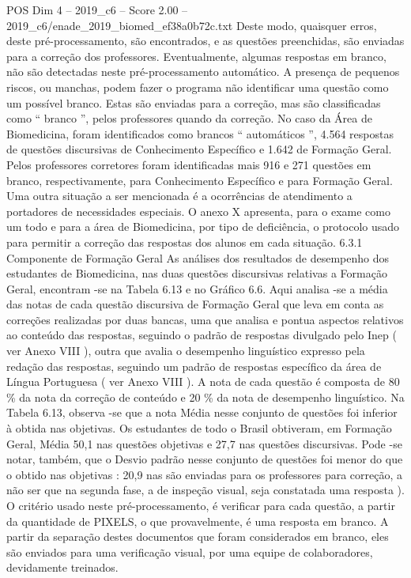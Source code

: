 \begin{textsample}{POS Dim 4 – 2019\_c6 – Score 2.00 – 2019\_c6/enade\_2019\_biomed\_ef38a0b72c.txt}
Deste modo, quaisquer erros, deste pré-processamento, são encontrados, e as questões preenchidas, são enviadas para a correção dos professores.
Eventualmente, algumas respostas em branco, não são detectadas neste pré-processamento automático.
A presença de pequenos riscos, ou manchas, podem fazer o programa não identificar uma questão como um possível branco.
Estas são enviadas para a correção, mas são classificadas como “ branco ”, pelos professores quando da correção.
No caso da Área de Biomedicina, foram identificados como brancos “ automáticos ”, 4.564 respostas de questões discursivas de Conhecimento Específico e 1.642 de Formação Geral.
Pelos professores corretores foram identificadas mais 916 e 271 questões em branco, respectivamente, para Conhecimento Específico e para Formação Geral.
Uma outra situação a ser mencionada é a ocorrências de atendimento a portadores de necessidades especiais.
O anexo X apresenta, para o exame como um todo e para a área de Biomedicina, por tipo de deficiência, o protocolo usado para permitir a correção das respostas dos alunos em cada situação. 6.3.1 Componente de Formação Geral As análises dos resultados de desempenho dos estudantes de Biomedicina, nas duas questões discursivas relativas a Formação Geral, encontram -se na Tabela 6.13 e no Gráfico 6.6.
Aqui analisa -se a média das notas de cada questão discursiva de Formação Geral que leva em conta as correções realizadas por duas bancas, uma que analisa e pontua aspectos relativos ao conteúdo das respostas, seguindo o padrão de respostas divulgado pelo Inep ( ver Anexo VIII ), outra que avalia o desempenho linguístico expresso pela redação das respostas, seguindo um padrão de respostas específico da área de Língua Portuguesa ( ver Anexo VIII ).
A nota de cada questão é composta de 80 \% da nota da correção de conteúdo e 20 \% da nota de desempenho linguístico.
Na Tabela 6.13, observa -se que a nota Média nesse conjunto de questões foi inferior à obtida nas objetivas.
Os estudantes de todo o Brasil obtiveram, em Formação Geral, Média 50,1 nas questões objetivas e 27,7 nas questões discursivas.
Pode -se notar, também, que o Desvio padrão nesse conjunto de questões foi menor do que o obtido nas objetivas : 20,9 nas são enviadas para os professores para correção, a não ser que na segunda fase, a de inspeção visual, seja constatada uma resposta ).
O critério usado neste pré-processamento, é verificar para cada questão, a partir da quantidade de PIXELS, o que provavelmente, é uma resposta em branco.
A partir da separação destes documentos que foram considerados em branco, eles são enviados para uma verificação visual, por uma equipe de colaboradores, devidamente treinados.

\end{textsample}
